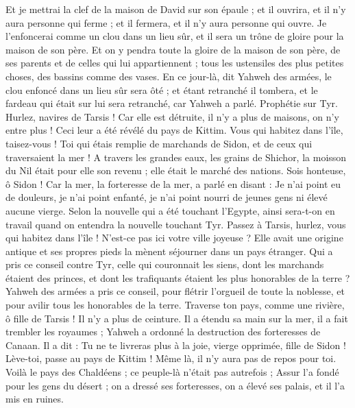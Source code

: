 \begin{multicols}{2}
Et je mettrai la clef de la maison de David sur son épaule ; et il ouvrira, et il n'y aura personne qui ferme ; et il fermera, et il n'y aura personne qui ouvre.
Je l'enfoncerai comme un clou dans un lieu sûr, et il sera un trône de gloire pour la maison de son père.
Et on y pendra toute la gloire de la maison de son père, de ses parents et de celles qui lui appartiennent ; tous les ustensiles des plus petites choses, des bassins comme des vases. 
En ce jour-là, dit Yahweh des armées, le clou enfoncé dans un lieu sûr sera ôté ; et étant retranché il tombera, et le fardeau qui était sur lui sera retranché, car Yahweh a parlé.
\VerseOne{}Prophétie sur Tyr. Hurlez, navires de Tarsis ! Car elle est détruite, il n'y a plus de maisons, on n'y entre plus ! Ceci leur a été révélé du pays de Kittim.
Vous qui habitez dans l'île, taisez-vous ! Toi qui étais remplie de marchands de Sidon, et de ceux qui traversaient la mer !
A travers les grandes eaux, les grains de Shichor, la moisson du Nil était pour elle son revenu ; elle était le marché des nations.
Sois honteuse, ô Sidon ! Car la mer, la forteresse de la mer, a parlé en disant : Je n'ai point eu de douleurs, je n'ai point enfanté, je n'ai point nourri de jeunes gens ni élevé aucune vierge.
Selon la nouvelle qui a été touchant l'Egypte, ainsi sera-t-on en travail quand on entendra la nouvelle touchant Tyr.
Passez à Tarsis, hurlez, vous qui habitez dans l'île !
N'est-ce pas ici votre ville joyeuse ? Elle avait une origine antique et ses propres pieds la mènent séjourner dans un pays étranger.
Qui a pris ce conseil contre Tyr, celle qui couronnait les siens, dont les marchands étaient des princes, et dont les trafiquants étaient les plus honorables de la terre ?
Yahweh des armées a pris ce conseil, pour flétrir l'orgueil de toute la noblesse, et pour avilir tous les honorables de la terre.
Traverse ton pays, comme une rivière, ô fille de Tarsis ! Il n'y a plus de ceinture.
Il a étendu sa main sur la mer, il a fait trembler les royaumes ; Yahweh a ordonné la destruction des forteresses de Canaan.
Il a dit : Tu ne te livreras plus à la joie, vierge opprimée, fille de Sidon ! Lève-toi, passe au pays de Kittim ! Même là, il n'y aura pas de repos pour toi.
Voilà le pays des Chaldéens ; ce peuple-là n'était pas autrefois ; Assur l'a fondé pour les gens du désert ; on a dressé ses forteresses, on a élevé ses palais, et il l'a mis en ruines.

\end{multicols}
